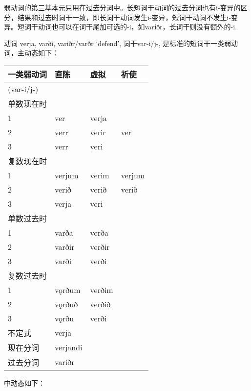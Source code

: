 弱动词的第三基本元只用在过去分词中。长短词干动词的过去分词也有i-变异的区分，结果和过去时词干一致，即长词干动词发生i-变异，短词干动词不发生i-变异。短词干动词也可以在词干尾加可选的-i，如var\textbf{i}ðr，长词干则没有额外的-i.

动词 verja, varði, variðr/varðr `defend‌', 词干var-i/j-,
是标准的短词干一类弱动词，主动态如下：

\begin{longtable}{llll}
\toprule
一类弱动词 & 直陈 & 虚拟 & 祈使 \\
\midrule
\endhead
\bottomrule
\endfoot
(var-i/j-) & & & \\
单数现在时 & & & \\
1 & ver & verja & \\
2 & verr & verir & ver \\
3 & verr & veri & \\
复数现在时 & & & \\
1 & verjum & verim & verjum \\
2 & verið & verið & verið \\
3 & verja & veri & \\
单数过去时 & & & \\
1 & varða & verða & \\
2 & varðir & verðir & \\
3 & varði & verði & \\
复数过去时 & & & \\
1 & vǫrðum & verðim & \\
2 & vǫrðuð & verðið & \\
3 & vǫrðu & verði & \\
不定式 & verja & & \\
现在分词 & verjandi & & \\
过去分词 & variðr & & \\
\end{longtable}

中动态如下：

